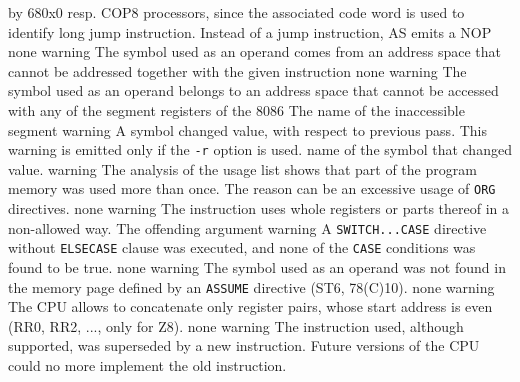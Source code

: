 \documentclass[12pt,twoside]{report}
\newcommand{\tty}[1]{{\tt #1}}
\newcommand{\asname}{{AS}}
\begin{document}
\begin{description}
{                by 680x0 resp. COP8 processors, since the associated code word is
                used to identify long jump instruction. Instead of a
                jump instruction, \asname{} emits a NOP}
               {none}
               {warning}
               {The symbol used as an operand comes from an address space
                that cannot be addressed together with the given instruction}
               {none}
               {warning}
               {The symbol used as an operand belongs to an address space
                that cannot be accessed with any of the segment registers of
                the 8086}
               {The name of the inaccessible segment}
               {warning}
               {A symbol changed value, with respect to previous pass. This
                warning is emitted only if the \tty{-r} option is used.}
               {name of the symbol that changed value.}
               {warning}
               {The analysis of the usage list shows that part of the
                program memory was used more than once. The reason can be an
                excessive usage of \tty{ORG} directives.}
               {none}
               {warning}
               {The instruction uses whole registers or parts thereof in
                a non-allowed way.}
               {The offending argument}
               {warning}
               {A \tty{SWITCH...CASE} directive without \tty{ELSECASE} clause was
                executed, and none of the \tty{CASE} conditions was found
                to be true.}
               {none}
               {warning}
               {The symbol used as an operand was not found in the memory
                page defined by an \tty{ASSUME} directive (ST6, 78(C)10).}
               {none}
               {warning}
               {The CPU allows to concatenate only register pairs, whose
                start address is even (RR0, RR2, ..., only for Z8).}
               {none}
               {warning}
               {The instruction used, although supported, was superseded by
                a new instruction. Future versions of the CPU could no more
                implement the old instruction.}

\end{description}
\end{document}
